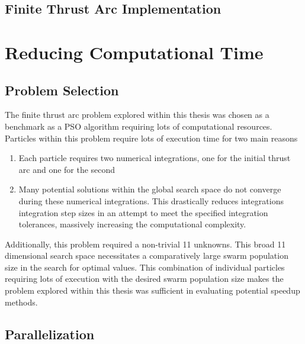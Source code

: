 \subsection{Finite Thrust Arc Implementation}

\section{Reducing Computational Time}

\subsection{Problem Selection}
The finite thrust arc problem explored within this thesis was chosen as a benchmark as a PSO algorithm requiring 
lots of computational resources. Particles within this problem require lots of execution time for two main reasons

\begin{enumerate}
    \item Each particle requires two numerical integrations, one for the initial thrust arc and one for the second
    \item Many potential solutions within the global search space do not converge during these numerical integrations. This drastically reduces integrations
    integration step sizes in an attempt to meet the specified integration tolerances, massively increasing the computational complexity. 
\end{enumerate}

Additionally, this problem required a non-trivial 11 unknowns. This broad 11 dimensional search space necessitates a comparatively large swarm population size
in the search for optimal values. This combination of individual particles requiring lots of execution with the desired swarm population size makes the problem explored within this thesis
was sufficient in evaluating potential speedup methods.

\subsection{Parallelization}

\newpage
